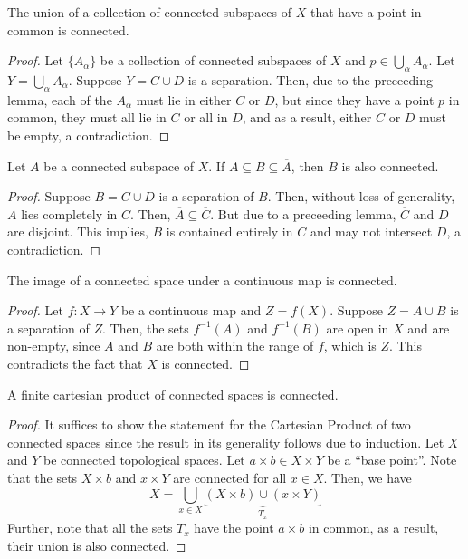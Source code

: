 \begin{theorem}
    The union of a collection of connected subspaces of $X$ that have a point in common is connected.
\end{theorem}
\begin{proof}
    Let $\{A_\alpha\}$ be a collection of connected subspaces of $X$ and $p\in\bigcup_\alpha A_\alpha$. Let $Y = \bigcup_\alpha A_\alpha$. Suppose $Y = C\cup D$ is a separation. Then, due to the preceeding lemma, each of the $A_\alpha$ must lie in either $C$ or $D$, but since they have a point $p$ in common, they must all lie in $C$ or all in $D$, and as a result, either $C$ or $D$ must be empty, a contradiction.
\end{proof}

\begin{theorem}
    Let $A$ be a connected subspace of $X$. If $A\subseteq B\subseteq\overline{A}$, then $B$ is also connected.
\end{theorem}
\begin{proof}
    Suppose $B = C\cup D$ is a separation of $B$. Then, without loss of generality, $A$ lies completely in $C$. Then, $\overline{A}\subseteq\overline{C}$. But due to a preceeding lemma, $\overline{C}$ and $D$ are disjoint. This implies, $B$ is contained entirely in $\overline{C}$ and may not intersect $D$, a contradiction.
\end{proof}

\begin{theorem}
    The image of a connected space under a continuous map is connected.
\end{theorem}
\begin{proof}
    Let $f:X\to Y$ be a continuous map and $Z = f(X)$. Suppose $Z = A\cup B$ is a separation of $Z$. Then, the sets $f^{-1}(A)$ and $f^{-1}(B)$ are open in $X$ and are non-empty, since $A$ and $B$ are both within the range of $f$, which is $Z$. This contradicts the fact that $X$ is connected.
\end{proof}

\begin{theorem}
    A finite cartesian product of connected spaces is connected.
\end{theorem}
\begin{proof}
    It suffices to show the statement for the Cartesian Product of two connected spaces since the result in its generality follows due to induction. Let $X$ and $Y$ be connected topological spaces. Let $a\times b\in X\times Y$ be a ``base point''. Note that the sets $X\times b$ and $x\times Y$ are connected for all $x\in X$. Then, we have 
    \begin{equation*}
        X = \bigcup_{x\in X}\underbrace{\left(X\times b\right) \cup \left(x\times Y\right)}_{T_x}
    \end{equation*}
    Further, note that all the sets $T_x$ have the point $a\times b$ in common, as a result, their union is also connected.
\end{proof}

